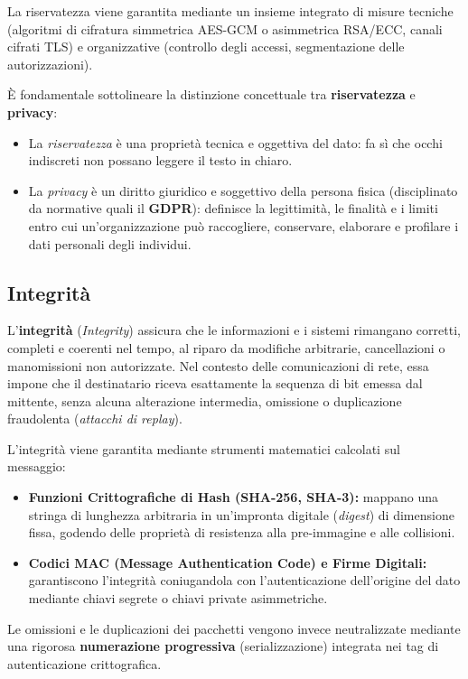 \documentclass[../../main.tex]{subfiles}
\begin{document}
La riservatezza viene garantita mediante un insieme integrato di misure tecniche (algoritmi di cifratura simmetrica AES-GCM o asimmetrica RSA/ECC, canali cifrati TLS) e organizzative (controllo degli accessi, segmentazione delle autorizzazioni).

È fondamentale sottolineare la distinzione concettuale tra \textbf{riservatezza} e \textbf{privacy}:
\begin{itemize}
    \item La \textit{riservatezza} è una proprietà tecnica e oggettiva del dato: fa sì che occhi indiscreti non possano leggere il testo in chiaro.
    \item La \textit{privacy} è un diritto giuridico e soggettivo della persona fisica (disciplinato da normative quali il \textbf{GDPR}): definisce la legittimità, le finalità e i limiti entro cui un'organizzazione può raccogliere, conservare, elaborare e profilare i dati personali degli individui.
\end{itemize}

\subsection{Integrità}
\label{subsec:integrita}

L'\textbf{integrità} (\textit{Integrity}) assicura che le informazioni e i sistemi rimangano corretti, completi e coerenti nel tempo, al riparo da modifiche arbitrarie, cancellazioni o manomissioni non autorizzate. Nel contesto delle comunicazioni di rete, essa impone che il destinatario riceva esattamente la sequenza di bit emessa dal mittente, senza alcuna alterazione intermedia, omissione o duplicazione fraudolenta (\textit{attacchi di replay}).

L'integrità viene garantita mediante strumenti matematici calcolati sul messaggio:
\begin{itemize}
    \item \textbf{Funzioni Crittografiche di Hash (SHA-256, SHA-3):} mappano una stringa di lunghezza arbitraria in un'impronta digitale (\textit{digest}) di dimensione fissa, godendo delle proprietà di resistenza alla pre-immagine e alle collisioni.
    \item \textbf{Codici MAC (Message Authentication Code) e Firme Digitali:} garantiscono l'integrità coniugandola con l'autenticazione dell'origine del dato mediante chiavi segrete o chiavi private asimmetriche.
\end{itemize}
Le omissioni e le duplicazioni dei pacchetti vengono invece neutralizzate mediante una rigorosa \textbf{numerazione progressiva} (serializzazione) integrata nei tag di autenticazione crittografica.
\end{document}
